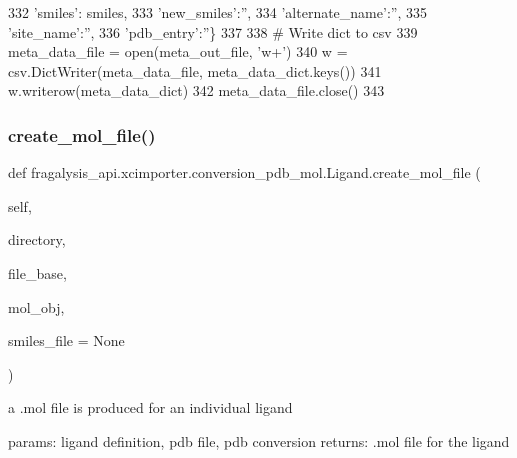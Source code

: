 \begin{DoxyCode}
332                           \textcolor{stringliteral}{'smiles'}: smiles,
333                           \textcolor{stringliteral}{'new\_smiles'}:\textcolor{stringliteral}{''},
334                           \textcolor{stringliteral}{'alternate\_name'}:\textcolor{stringliteral}{''},
335                           \textcolor{stringliteral}{'site\_name'}:\textcolor{stringliteral}{''},
336                           \textcolor{stringliteral}{'pdb\_entry'}:\textcolor{stringliteral}{''}\}
337 
338         \textcolor{comment}{# Write dict to csv}
339         meta\_data\_file = open(meta\_out\_file, \textcolor{stringliteral}{'w+'})
340         w = csv.DictWriter(meta\_data\_file, meta\_data\_dict.keys())
341         w.writerow(meta\_data\_dict)
342         meta\_data\_file.close()
343 
\end{DoxyCode}
\mbox{\label{classfragalysis__api_1_1xcimporter_1_1conversion__pdb__mol_1_1_ligand_a811498c568a5f12e8047ced3640a3c90}} 
\subsubsection{\texorpdfstring{create\+\_\+mol\+\_\+file()}{create\_mol\_file()}}
{\footnotesize\ttfamily def fragalysis\+\_\+api.\+xcimporter.\+conversion\+\_\+pdb\+\_\+mol.\+Ligand.\+create\+\_\+mol\+\_\+file (\begin{DoxyParamCaption}\item[{}]{self,  }\item[{}]{directory,  }\item[{}]{file\+\_\+base,  }\item[{}]{mol\+\_\+obj,  }\item[{}]{smiles\+\_\+file = {\ttfamily None} }\end{DoxyParamCaption})}

\begin{DoxyVerb}a .mol file is produced for an individual ligand

params: ligand definition, pdb file, pdb conversion
returns: .mol file for the ligand
\end{DoxyVerb}
 

